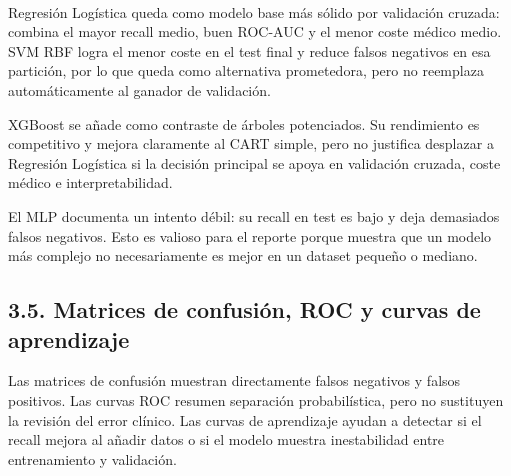 \documentclass[11pt]{article}
\begin{document}
    
    \begin{center}
    \end{center}
    { \hspace*{\fill} \\}
    
    Regresión Logística queda como modelo base más sólido por validación
cruzada: combina el mayor recall medio, buen ROC-AUC y el menor coste
médico medio. SVM RBF logra el menor coste en el test final y reduce
falsos negativos en esa partición, por lo que queda como alternativa
prometedora, pero no reemplaza automáticamente al ganador de validación.

XGBoost se añade como contraste de árboles potenciados. Su rendimiento
es competitivo y mejora claramente al CART simple, pero no justifica
desplazar a Regresión Logística si la decisión principal se apoya en
validación cruzada, coste médico e interpretabilidad.

El MLP documenta un intento débil: su recall en test es bajo y deja
demasiados falsos negativos. Esto es valioso para el reporte porque
muestra que un modelo más complejo no necesariamente es mejor en un
dataset pequeño o mediano.

    \subsection{3.5. Matrices de confusión, ROC y curvas de
aprendizaje}\label{matrices-de-confusiuxf3n-roc-y-curvas-de-aprendizaje}

Las matrices de confusión muestran directamente falsos negativos y
falsos positivos. Las curvas ROC resumen separación probabilística, pero
no sustituyen la revisión del error clínico. Las curvas de aprendizaje
ayudan a detectar si el recall mejora al añadir datos o si el modelo
muestra inestabilidad entre entrenamiento y validación.
\end{document}
